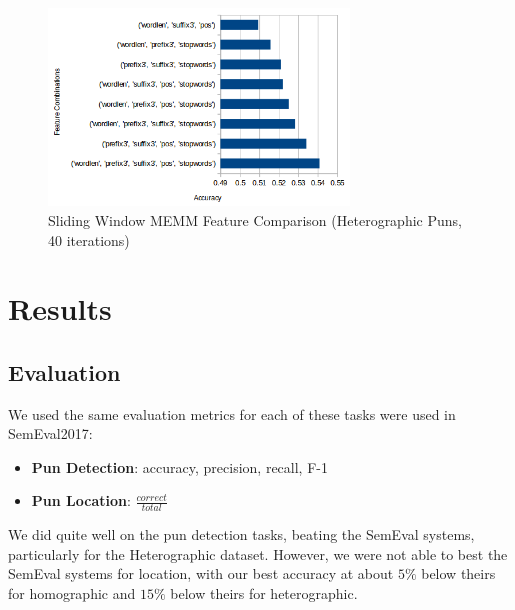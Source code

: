 \documentclass{article}
\begin{document}
\begin{figure}[h!]
    \centering
    \includegraphics[width=8cm]{figures/sliding_window_heterographic.png}
	\caption{Sliding Window MEMM Feature Comparison (Heterographic Puns, 40 iterations)}
    \label{fig:method}
\end{figure}



\section{Results}\label{results}

\subsection{Evaluation}

We used the same evaluation metrics for each of these tasks were used in
SemEval2017:

\begin{itemize}
	\item{
		\textbf{Pun Detection}: accuracy, precision, recall, F-1
	}
	\item{
		\textbf{Pun Location}: $\frac{correct}{total}$
	}
\end{itemize}

We did quite well on the pun detection tasks, beating the SemEval systems,
particularly for the Heterographic dataset. However, we were not able to best
the SemEval systems for location, with our best accuracy at about $5\%$ below
theirs for homographic and $15\%$ below theirs for heterographic.
\end{document}
